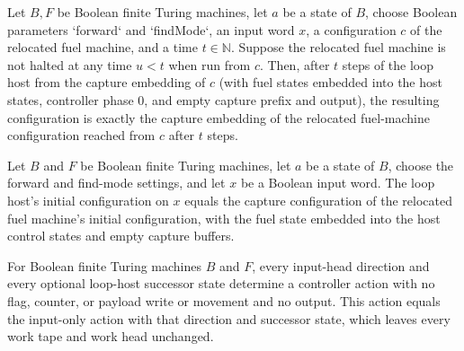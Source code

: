 \begin{lemma}
\label{Turing.FinTM.loopHost_fuel_capture}
\leanok
{}
Let $B,F$ be Boolean finite Turing machines, let $a$ be a state of $B$, choose Boolean
parameters `forward` and `findMode`, an input word $x$, a configuration $c$ of the
relocated fuel machine, and a time $t\in\mathbb N$. Suppose the relocated fuel machine
is not halted at any time $u<t$ when run from $c$. Then, after $t$ steps of the loop
host from the capture embedding of $c$ (with fuel states embedded into the host states,
controller phase $0$, and empty capture prefix and output), the resulting configuration
is exactly the capture embedding of the relocated fuel-machine configuration reached
from $c$ after $t$ steps.
\end{lemma}

\begin{lemma}
\label{Turing.FinTM.loopHost_init}
\leanok
{}
Let $B$ and $F$ be Boolean finite Turing machines, let $a$ be a state of $B$, choose the
forward and find-mode settings, and let $x$ be a Boolean input word. The loop host's
initial configuration on $x$ equals the capture configuration of the relocated fuel
machine's initial configuration, with the fuel state embedded into the host control
states and empty capture buffers.
\end{lemma}

\begin{lemma}
\label{Turing.FinTM.loopControl_idle}
\leanok
{}
For Boolean finite Turing machines $B$ and $F$, every input-head direction and every
optional loop-host successor state determine a controller action with no flag, counter,
or payload write or movement and no output. This action equals the input-only action
with that direction and successor state, which leaves every work tape and work head
unchanged.
\end{lemma}


